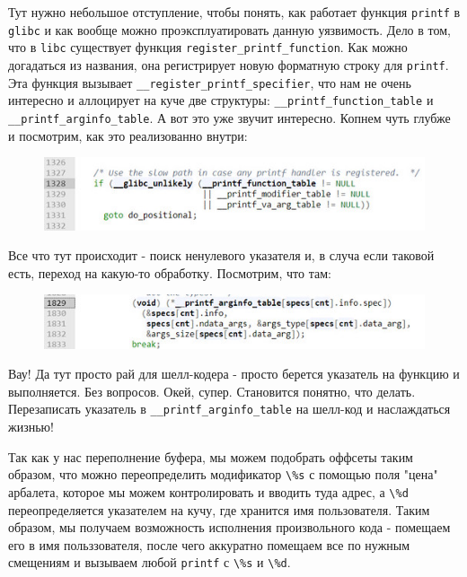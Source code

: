 \documentclass[idxtotoc,hyperref,openany,oneside]{files/pwn} %
\begin{document}
Тут нужно небольшое отступление, чтобы понять, как работает функция \verb|printf| в \verb|glibc| и как вообще можно проэксплуатировать данную уязвимость. Дело в том, что в \verb|libc| существует функция \verb|register_printf_function|. Как можно догадаться из названия, она регистрирует новую форматную строку для \verb|printf|. Эта функция вызывает \verb|__register_printf_specifier|, что нам не очень интересно и аллоцирует на куче две структуры: \verb|__printf_function_table| и \verb|__printf_arginfo_table|. А вот это уже звучит интересно. Копнем чуть глубже и посмотрим, как это реализованно внутри:
\begin{figure}[H]
\begin{center}
\includegraphics[width=1.0\linewidth]{files/heap-pft}
\end{center}
\label{fig:heap-pft}
\end{figure}

Все что тут происходит - поиск ненулевого указателя и, в случа если таковой есть, переход на какую-то обработку. Посмотрим, что там:
\begin{figure}[H]
\begin{center}
\includegraphics[width=1.0\linewidth]{files/heap-pat}
\end{center}
\label{fig:heap-pat}
\end{figure}
Вау! Да тут просто рай для шелл-кодера - просто берется указатель на функцию и выполняется. Без вопросов. Окей, супер. Становится понятно, что делать. Перезаписать указатель в \verb|__printf_arginfo_table| на шелл-код и наслаждаться жизнью!

Так как у нас переполнение буфера, мы можем подобрать оффсеты таким образом, что можно переопределить модификатор \verb|\%s| с помощью поля "цена" арбалета, которое мы можем контролировать и вводить туда адрес, а \verb|\%d| переопределяется указателем на кучу, где хранится имя пользователя. Таким образом, мы получаем возможность исполнения произвольного кода - помещаем его в имя польззователя, после чего аккуратно помещаем все по нужным смещениям и вызываем любой \verb|printf| с \verb|\%s| и \verb|\%d|.
\end{document}
